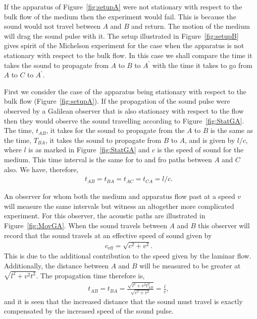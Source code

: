 \documentclass[10pt, fleqn,draft,showtrims,oldfontcommands]{article} %
\newcommand{\figref}[1]{Figure~\ref{fig:#1}}
\newcommand{\eff}{{\textrm{eff}}}
\begin{document}
If the apparatus of \figref{setupA} were not stationary with respect to the bulk flow of the medium then the experiment would fail.
This is because the sound would not travel between $A$ and $B$ and return.
The motion of the medium will drag the sound pulse with it.
The setup illustrated in \figref{setupB} gives spirit of the Michelson experiment for the case when the apparatus is not stationary with respect to the bulk flow.
In this case we shall compare the time it takes the sound to propagate from $A$ to $B$ to $A^\prime$ with the time it takes 
to go from $A$ to $C$ to $A^\prime$.

First we consider the case of the apparatus being stationary with respect to the bulk flow (\figref{setupA}).
If the propagation of the sound pulse were observed by a Galilean observer that is also stationary with respect to the flow
then they would observe the sound travelling according to \figref{StatGA}.
The time, $t_{AB}$, it takes for the sound to propagate from the $A$ to $B$ is the same as the time, $T_{BA}$, it takes the sound to propagate from $B$ to $A$,
and is given by $l/c$, where $l$ is as marked in \figref{StatGA} and $c$ is the speed of sound for the medium.
This time interval is the same for to and fro paths between $A$ and $C$ also.
We have, therefore, 
\begin{align}
  t_{AB}=t_{BA}=t_{AC}=t_{CA}=l/c\label{eqn:setupA:stationary:Tab}.
\end{align}

An observer for whom  both the medium and apparatus flow past at a speed $v$ will measure the same intervals 
but witness an altogether more complicated experiment.
For this observer, the acoustic paths are illustrated in \figref{MovGA}.
When the sound travels between $A$ and $B$ this observer will record that the sound travels at an effective speed of sound given by 
\begin{align}
c_\eff = \sqrt{c^2 +v^2}.
\end{align}
This is due to the additional contribution to the speed given by the  laminar flow.
Additionally, the distance between $A$ and $B$ will be measured to be greater at  $\sqrt{l^2+v^2t^2}$.
The propagation time therefore is,
\begin{align}
  \label{eqn:setupA:moving:Tab}
  t_{AB} = t_{BA} = \frac{\sqrt{l^2+v^2t_{AB}^2}}{\sqrt{c^2 +v^2}} = \frac{l}{c},
\end{align}
and it is seen that the increased distance that the sound must travel is exactly compensated by the increased speed of the sound pulse.
\end{document}
